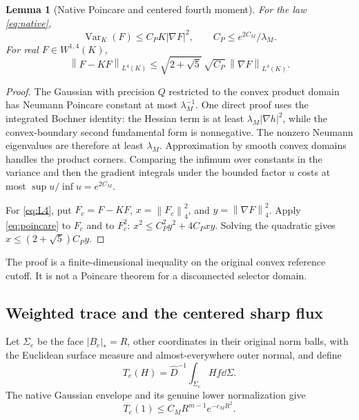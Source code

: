 \documentclass[11pt,letterpaper]{article}
\newtheorem{lemma}[theorem]{Lemma}
\theoremstyle{remark}\newtheorem{remark}[theorem]{Remark}
\newcommand{\Var}{\operatorname{Var}}\newcommand{\Cov}{\operatorname{Cov}}
\newcommand{\norm}[1]{\left\lVert#1\right\rVert}
\begin{document}
\begin{lemma}[Native Poincare and centered fourth moment]\label{lem:poincare}
For the law \eqref{eq:native},
\begin{equation}\label{eq:poincare}
 \Var_K(F)\le C_P K|\nabla F|^2,\qquad
 C_P\le e^{2C_M}/\lambda_M.
\end{equation}
For real $F\in W^{1,4}(K)$,
\begin{equation}\label{eq:L4}
 \norm{F-KF}_{L^4(K)}
 \le \sqrt{2+\sqrt5}\,\sqrt{C_P}\,
             \norm{\nabla F}_{L^4(K)}.
\end{equation}
\end{lemma}
\begin{proof}
The Gaussian with precision $Q$ restricted to the convex product domain has Neumann Poincare constant at most $\lambda_M^{-1}$. One direct proof uses the integrated Bochner identity: the Hessian term is at least $\lambda_M|\nabla h|^2$, while the convex-boundary second fundamental form is nonnegative. The nonzero Neumann eigenvalues are therefore at least $\lambda_M$. Approximation by smooth convex domains handles the product corners. Comparing the infimum over constants in the variance and then the gradient integrals under the bounded factor $u$ costs at most $\sup u/\inf u=e^{2C_M}$.

For \eqref{eq:L4}, put $F_c=F-KF$, $x=\norm{F_c}_4^2$, and $y=\norm{\nabla F}_4^2$. Apply \eqref{eq:poincare} to $F_c$ and to $F_c^2$:
$x^2\le C_P^2y^2+4C_Pxy$. Solving the quadratic gives $x\le(2+\sqrt5)C_Py$.
\end{proof}

The proof is a finite-dimensional inequality on the original convex reference cutoff. It is not a Poincare theorem for a disconnected selector domain.

\subsection{Weighted trace and the centered sharp flux}

Let $\Sigma_e$ be the face $|B_e|_*=R$, other coordinates in their original norm balls, with the Euclidean surface measure and almost-everywhere outer normal, and define
\[
 T_e(H)=\widehat D^{-1}\int_{\Sigma_e}Hf\dd\Sigma.
\]
The native Gaussian envelope and its genuine lower normalization give
\begin{equation}\label{eq:facemass}
 T_e(1)\le C_M R^{m-1}e^{-c_MR^2}.
\end{equation}
\end{document}
